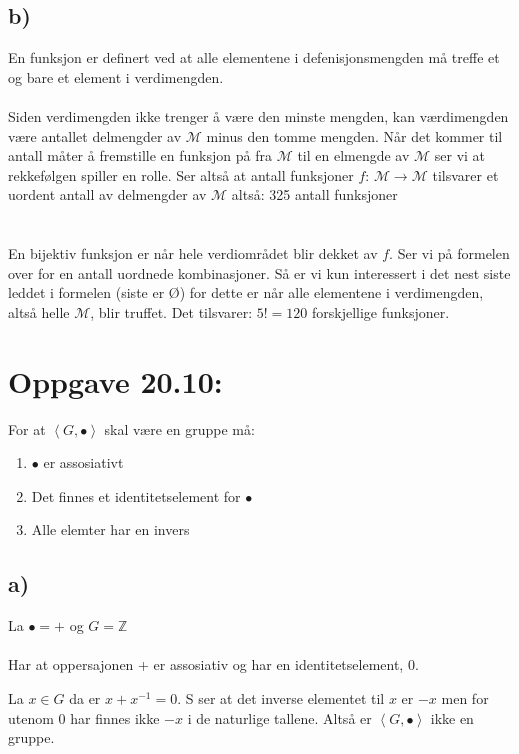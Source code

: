 \documentclass[a4paper, norsk, 10pt]{article}
\begin{document}
\begin{flushleft}
  \subsection*{b)}
  En funksjon er definert ved at alle elementene i defenisjonsmengden må treffe et og bare et element i verdimengden.
  \ \\ \ \\
  Siden verdimengden ikke trenger å være den minste mengden, kan værdimengden være antallet delmengder av $\mathcal{M}$ minus den tomme mengden. Når det kommer til antall måter å fremstille en funksjon på fra $\mathcal{M}$ til en elmengde av $\mathcal{M}$ ser vi at rekkefølgen spiller en rolle. Ser altså at antall funksjoner $f: \, \mathcal{M} \rightarrow \mathcal{M}$ tilsvarer et uordent antall av delmengder av $\mathcal{M}$ altså:  325 antall funksjoner
  \ \\ \ \\ \ \\ 
  En bijektiv funksjon er når hele verdiområdet blir dekket av $f$. Ser vi på formelen over for en antall uordnede kombinasjoner. Så er vi kun interessert i det nest siste leddet i formelen (siste er Ø) for dette er når alle elementene i verdimengden, altså helle $\mathcal{M}$, blir truffet. Det tilsvarer:  $5! = 120$ forskjellige funksjoner.



  \section*{Oppgave 20.10:}
  For at $\left<G, \bullet\right>$ skal være en gruppe må:
  \begin{enumerate}
  \item $\bullet$ er assosiativt
  \item Det finnes et identitetselement for $\bullet$
  \item Alle elemter har en invers
  \end{enumerate}

  
  \subsection*{a)}
  La $\bullet = +$ og $G = \mathbb{Z}$ \\
    \ \\
  Har at oppersajonen + er assosiativ og har en identitetselement, 0.

  La $x \in G$ da er $x + x^{-1} = 0$. S ser at det inverse elementet til $x$ er $-x$ men for utenom 0 har finnes ikke $-x$ i de naturlige tallene. Altså er  $\left<G, \bullet \right>$ ikke en gruppe.  


\end{flushleft}
\end{document}
